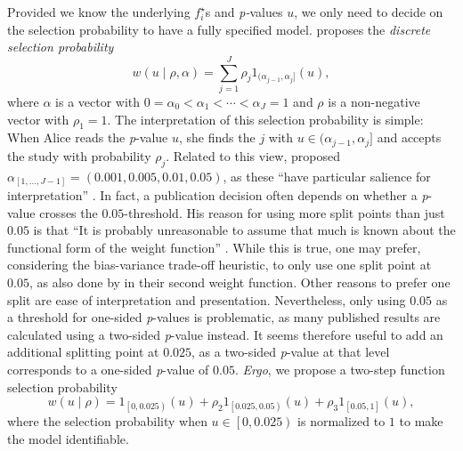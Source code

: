 \documentclass[preprint, authoryear]{elsarticle}
\theoremstyle{plain}
\theoremstyle{definition}
\begin{document}
Provided we know the underlying $f_{i}^{\star}$s and \emph{p-}values $u$, we only need to decide on the selection probability to have a fully specified model. \citet{hedges1992modeling} proposes the \emph{discrete selection probability}
\begin{equation}
w\left(u\mid\rho,\alpha\right)=\sum_{j=1}^{J}\rho_{j}1_{(\alpha_{j-1},\alpha_{j}]}\left(u\right),\label{eq:Weighted model step function}
\end{equation}
where $\alpha$ is a vector with $0=\alpha_{0}<\alpha_{1}<\cdots<\alpha_{J}=1$ and $\rho$ is a non-negative vector with $\rho_{1}=1$. The interpretation of this selection probability is simple: When Alice reads the \emph{p}-value $u$, she finds the $j$ with $u\in(\alpha_{j-1},\alpha_{j}]$ and accepts the study with probability $\rho_{j}$. Related to this view, \citet{hedges1992modeling} proposed $\alpha_{[1,\dots,J-1]} = \left(0.001,0.005,0.01,0.05\right)$, as these ``have particular salience for interpretation'' \citep{hedges1992modeling}. In fact, a publication decision often depends on whether a \emph{p}-value crosses the $0.05$-threshold. His reason for using more split points than just $0.05$ is that ``It is probably unreasonable to assume that much is known about the functional form of the weight function'' \citep{hedges1992modeling}. While this is true, one may prefer, considering the bias-variance trade-off heuristic, to only use one split point at $0.05$, as also done by \citet{iyengar1988selection} in their second weight function. Other reasons to prefer one split are ease of interpretation and presentation. Nevertheless, only using $0.05$ as a threshold for one-sided \emph{p}-values is problematic, as many published results are calculated using a two-sided \emph{p}-value instead. It seems therefore useful to add an additional splitting point at $0.025$, as a two-sided \emph{p}-value at that level corresponds to a one-sided \emph{p}-value of $0.05$. \emph{Ergo}, we propose a two-step function selection probability
\[
w\left(u\mid\rho\right)=1_{\left[0,0.025\right)}\left(u\right)+\rho_{2}1_{\left[0.025,0.05\right)}\left(u\right)+\rho_{3}1_{\left[0.05,1\right]}\left(u\right),
\]
where the selection probability when $u\in\left[0,0.025\right)$ is normalized to $1$ to make the model identifiable.
\end{document}
